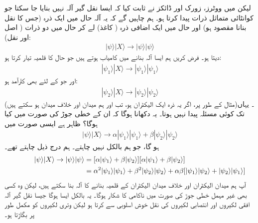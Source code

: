 لیکن میں ووٹرز، زورک اور ڈائکز نے ثابت کیا کہ ایسا نقل گیر آلہ نہیں بنایا جا سکتا جو کوانٹائی متماثل ذرات پیدا کرتا ہو۔ ہم چاہیں گے کہ یہ آلہ حال  میں ایک ذرہ (جس کا نقل بنانا مقصود ہو) اور حال  میں ایک اضافی ذرہ (  کاغذ) لے کر حال  میں دو ذرات ( اصل اور نقل):
\begin{align}
	|\psi\rangle| X\rangle\to|\psi\rangle|\psi\rangle
\end{align}
 دیتا ہو۔ فرض کریں ہم ایسا آلہ بنانے میں کامیاب ہوتے ہیں جو حال  کا قلمیہ تیار کرتا ہو: 
\begin{align}
	|\psi_1\rangle| X\rangle\to|\psi_1\rangle|\psi_1\rangle
\end{align}
اور جو  کے لئے بھی کارآمد ہو:
\begin{align}
	|\psi_2\rangle| X\rangle\to|\psi_2\rangle|\psi_2\rangle
\end{align}
(مثال کے طور پر، اگر یہ ذرہ ایک الیکٹران ہو، تب  اور  ہم میدان اور خلاف میدان ہو سکتے ہیں)۔ یہاں تک کوئی مسئلہ پیدا نہیں ہوتا۔ یہ دکھانا ہوگا کہ ان کے خطی جوڑ  کی صورت میں کیا ہوگا؟ ظاہر ہے ایسی صورت میں
\begin{align}
	|\psi\rangle| X\rangle\to\alpha|\psi_1\rangle|\psi_1\rangle+\beta|\psi_2\rangle|\psi_2\rangle
\end{align}
ہو گا، جو ہم بالکل نہیں چاہتے۔ ہم درج ذیل چاہتے تھے۔
\begin{align}
\hspace*{1cm} |\psi\rangle| X\rangle\to|\psi\rangle|\psi\rangle &= [\alpha|\psi_1\rangle+\beta|\psi_2\rangle][\alpha|\psi_1\rangle+\beta|\psi_2\rangle]\nonumber \\
	&= \alpha^2|\psi_1\rangle|\psi_1\rangle+\beta^2|\psi_2\rangle|\psi_2\rangle+\alpha\beta[|\psi_1\rangle|\psi_2\rangle+|\psi_2\rangle|\psi_1\rangle]
\end{align}
آپ ہم میدان الیکٹران اور خلاف میدان الیکٹران کے قلمیہ بنانے کا آلہ بنا سکتے ہیں، لیکن وہ کسی بھی غیر مہمل خطی جوڑ کی صورت میں ناکامی کا شکار ہوگا۔ یہ بالکل ایسا ہوگا جیسا نقل گیر آلہ افقی لکیروں اور انتصابی لکیروں کی نقل خوش اسلوبی سے کرتا ہو لیکن وتری لکیروں کو مکمل طور پر بگاڑتا ہو۔

